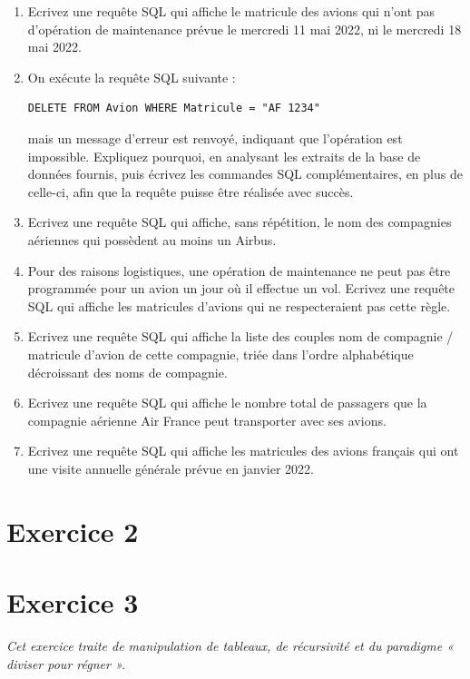 \documentclass[11pt,a4paper,french,twoside]{PMCours}
\begin{document}
\begin{enumerate}
\item Ecrivez une requête SQL qui affiche le matricule des avions qui n'ont pas d'opération de maintenance prévue le mercredi 11 mai 2022, ni le mercredi 18 mai 2022.
\item On exécute la requête SQL suivante :
\begin{verbatim}
DELETE FROM Avion WHERE Matricule = "AF 1234"
\end{verbatim} 
mais un message d'erreur est renvoyé, indiquant que l'opération est impossible. Expliquez pourquoi, en analysant les extraits de la base de données fournis, puis écrivez les commandes SQL complémentaires, en plus de celle-ci, afin que la requête puisse être réalisée avec succès.
\item Ecrivez une requête SQL qui affiche, sans répétition, le nom des compagnies aériennes qui possèdent au moins un Airbus.
\item Pour des raisons logistiques, une opération de maintenance ne peut pas être programmée pour un avion un jour où il effectue un vol. Ecrivez une requête SQL qui affiche les matricules d'avions qui ne respecteraient pas cette règle.
\item Ecrivez une requête SQL qui affiche la liste des couples nom de compagnie / matricule d'avion de cette compagnie, triée dans l'ordre alphabétique décroissant des noms de compagnie.
\item Ecrivez une requête SQL qui affiche le nombre total de passagers que la compagnie aérienne Air France peut transporter avec ses avions.
\item Ecrivez une requête SQL qui affiche les matricules des avions français qui ont une visite annuelle générale prévue en janvier 2022.
\end{enumerate}


\newpage
\section*{Exercice 2}


\newpage
\section*{Exercice 3}
\emph{Cet exercice traite de manipulation de tableaux, de récursivité et du paradigme
« diviser pour régner ».}
\end{document}
